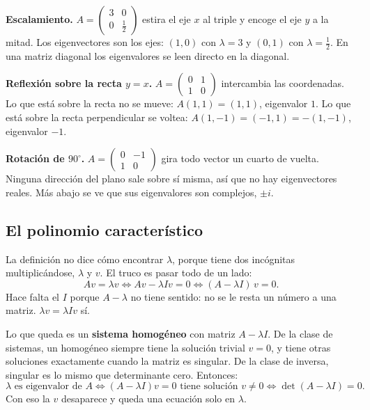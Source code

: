 \documentclass[11pt,letterpaper]{article}
\begin{document}
\begin{ejemplo}
    \textbf{Escalamiento.}
    $A = \begin{pmatrix} 3 & 0 \\ 0 & \tfrac{1}{2} \end{pmatrix}$
    estira el eje $x$ al triple y encoge el eje $y$ a la mitad. Los
    eigenvectores son los ejes: $(1, 0)$ con $\lambda = 3$ y $(0, 1)$
    con $\lambda = \tfrac{1}{2}$. En una matriz diagonal los
    eigenvalores se leen directo en la diagonal.

    \textbf{Reflexión sobre la recta $y = x$.}
    $A = \begin{pmatrix} 0 & 1 \\ 1 & 0 \end{pmatrix}$ intercambia las
    coordenadas. Lo que está sobre la recta no se mueve:
    $A(1, 1) = (1, 1)$, eigenvalor $1$. Lo que está sobre la recta
    perpendicular se voltea: $A(1, -1) = (-1, 1) = -(1, -1)$,
    eigenvalor $-1$.

    \textbf{Rotación de $90^\circ$.}
    $A = \begin{pmatrix} 0 & -1 \\ 1 & 0 \end{pmatrix}$ gira todo
    vector un cuarto de vuelta. Ninguna dirección del plano sale sobre
    sí misma, así que no hay eigenvectores reales. Más abajo se ve que
    sus eigenvalores son complejos, $\pm i$.
\end{ejemplo}


\subsection*{El polinomio característico}

La definición no dice cómo encontrar $\lambda$, porque tiene dos
incógnitas multiplicándose, $\lambda$ y $v$. El truco es pasar todo de
un lado:
\[
    Av = \lambda v
    \iff Av - \lambda I v = 0
    \iff (A - \lambda I)\, v = 0 .
\]
Hace falta el $I$ porque $A - \lambda$ no tiene sentido: no se le
resta un número a una matriz. $\lambda v = \lambda I v$ sí.

Lo que queda es un \textbf{sistema homogéneo} con matriz
$A - \lambda I$. De la clase de sistemas, un homogéneo siempre tiene la
solución trivial $v = 0$, y tiene otras soluciones exactamente cuando
la matriz es singular. De la clase de inversa, singular es lo mismo que
determinante cero. Entonces:
\[
    \lambda \text{ es eigenvalor de } A
    \iff (A - \lambda I)v = 0 \text{ tiene solución } v \neq 0
    \iff \det(A - \lambda I) = 0 .
\]
Con eso la $v$ desaparece y queda una ecuación solo en $\lambda$.
\end{document}
